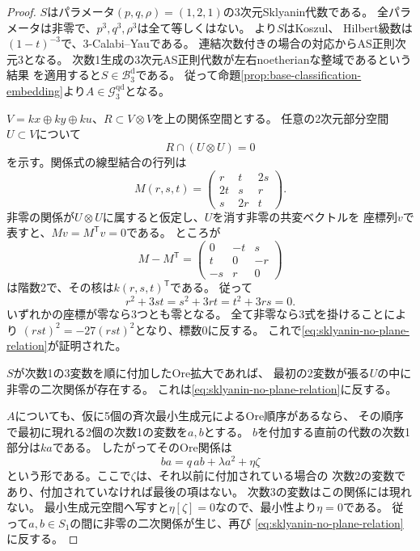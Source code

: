 \documentclass[11pt,a4paper]{ltjsarticle}
\theoremstyle{definition}
\newcommand{\Gclass}{\mathcal G}
\newcommand{\Bclass}{\mathcal B}
\begin{document}
\begin{proof}
$S$はパラメータ$(p,q,\rho)=(1,2,1)$の3次元Sklyanin代数である。
全パラメータは非零で、$p^3,q^3,\rho^3$は全て等しくはない。
\cite[Theorem 1.1, Corollary 6.1]{IS}より$S$はKoszul、
Hilbert級数は$(1-t)^{-3}$で、3-Calabi--Yauである。
連結次数付きの場合の対応\cite[Lemma 1.3, \S1.2]{LWW}からAS正則次元3となる。
次数1生成の3次元AS正則代数が左右noetherianな整域であるという結果
\cite[Theorem 6.2(i)]{Lev}を適用すると$S\in\Bclass_3^{\mathrm d}$である。
従って命題\ref{prop:base-classification-embedding}より$A\in\Gclass_3^{\mathrm{qd}}$となる。

$V=kx\oplus ky\oplus ku$、$R\subset V\otimes V$を上の関係空間とする。
任意の2次元部分空間$U\subset V$について
\begin{equation}\label{eq:sklyanin-no-plane-relation}
R\cap(U\otimes U)=0
\end{equation}
を示す。関係式の線型結合の行列は
\[
M(r,s,t)=
\begin{pmatrix}
r&t&2s\\
2t&s&r\\
s&2r&t
\end{pmatrix}.
\]
非零の関係が$U\otimes U$に属すると仮定し、$U$を消す非零の共変ベクトルを
座標列$v$で表すと、$Mv=M^{\mathsf T}v=0$である。
ところが
\[
M-M^{\mathsf T}=
\begin{pmatrix}0&-t&s\\t&0&-r\\-s&r&0\end{pmatrix}
\]
は階数2で、その核は$k(r,s,t)^{\mathsf T}$である。
従って
\[
r^2+3st=s^2+3rt=t^2+3rs=0.
\]
いずれかの座標が零なら3つとも零となる。
全て非零なら3式を掛けることにより
$(rst)^2=-27(rst)^2$となり、標数0に反する。
これで\eqref{eq:sklyanin-no-plane-relation}が証明された。

$S$が次数1の3変数を順に付加したOre拡大であれば、
最初の2変数が張る$U$の中に非零の二次関係が存在する。
これは\eqref{eq:sklyanin-no-plane-relation}に反する。

$A$についても、仮に5個の斉次最小生成元によるOre順序があるなら、
その順序で最初に現れる2個の次数1の変数を$a,b$とする。
$b$を付加する直前の代数の次数1部分は$ka$である。
したがってそのOre関係は
\[
ba=q\,ab+\lambda a^2+\eta\zeta
\]
という形である。ここで$\zeta$は、それ以前に付加されている場合の
次数2の変数であり、付加されていなければ最後の項はない。
次数3の変数はこの関係には現れない。
最小生成元空間へ写すと$\eta[\zeta]=0$なので、最小性より$\eta=0$である。
従って$a,b\in S_1$の間に非零の二次関係が生じ、再び
\eqref{eq:sklyanin-no-plane-relation}に反する。
\end{proof}
\end{document}
